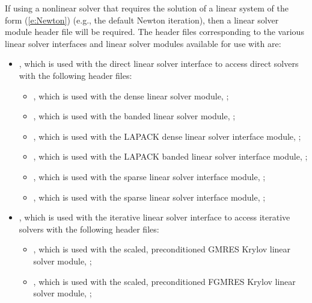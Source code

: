 If using a nonlinear solver that requires the solution of a linear
system of the form (\ref{e:Newton}) (e.g., the default Newton iteration),
then a linear solver module header file will be required.
The header files corresponding to the various linear solver
interfaces and linear solver modules available for use with
{\cvode} are:
\begin{itemize}
\item {},
  which is used with the {\cvdls} direct linear solver interface to
  access direct solvers with the following header files:
  \begin{itemize}
  \item {},
    which is used with the dense linear solver module,
    {\sunlinsoldense};

  \item {},
    which is used with the banded linear solver module,
    {\sunlinsolband};

  \item {},
    which is used with the LAPACK dense linear solver interface module,
    {\sunlinsollapdense};

  \item {},
    which is used with the LAPACK banded linear solver interface module,
    {\sunlinsollapband};

  \item {},
    which is used with the {\klu} sparse linear solver interface module,
    {\sunlinsolklu};

  \item {},
    which is used with the {\superlumt} sparse linear solver interface
    module, {\sunlinsolslumt};
  \end{itemize}

\item {},
  which is used with the {\cvspils} iterative linear solver interface to
  access iterative solvers with the following header files:
  \begin{itemize}
  \item {},
    which is used with the scaled, preconditioned GMRES Krylov linear
    solver module, {\sunlinsolspgmr};

  \item {},
    which is used with the scaled, preconditioned FGMRES Krylov linear
    solver module, {\sunlinsolspfgmr};


\end{itemize}
\end{itemize}
